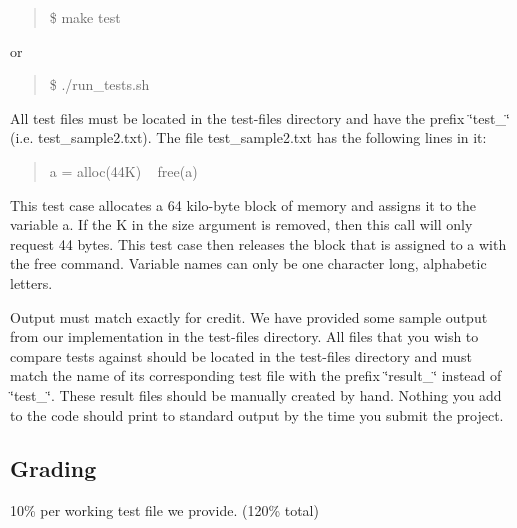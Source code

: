 \begin{quote}
{\ttfamily \$ make test} \end{quote}
or \begin{quote}
{\ttfamily \$ ./run\+\_\+tests.sh} \end{quote}


All test files must be located in the test-\/files directory and have the prefix \char`\"{}test\+\_\+\char`\"{} (i.\+e. test\+\_\+sample2.\+txt). The file test\+\_\+sample2.\+txt has the following lines in it\+:

\begin{quote}
{\ttfamily a = alloc(44\+K)} ~\newline
 {\ttfamily free(a)} \end{quote}


This test case allocates a 64 kilo-\/byte block of memory and assigns it to the variable \textquotesingle{}a\textquotesingle{}. If the \textquotesingle{}K\textquotesingle{} in the size argument is removed, then this call will only request 44 bytes. This test case then releases the block that is assigned to \textquotesingle{}a\textquotesingle{} with the free command. Variable names can only be one character long, alphabetic letters.

Output must match exactly for credit. We have provided some sample output from our implementation in the test-\/files directory. All files that you wish to compare tests against should be located in the test-\/files directory and must match the name of its corresponding test file with the prefix \char`\"{}result\+\_\+\char`\"{} instead of \char`\"{}test\+\_\+\char`\"{}. These result files should be manually created by hand. Nothing you add to the code should print to standard output by the time you submit the project.

\subsection*{Grading}

10\% per working test file we provide. (120\% total) 